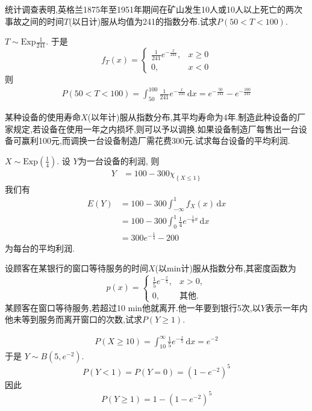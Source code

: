 \documentclass[../main.tex]{subfiles}
\begin{document}
\begin{exercise}{}{}
统计调查表明,英格兰1875年至1951年期间在矿山发生10人或10人以上死亡的两次事故之间的时间$T$(以日计)服从均值为241的指数分布.试求$P(50<T<100)$.
\end{exercise}

\begin{solution}
       \(  T\sim \mathrm{Exp}\frac{1 }{241 }   \). 于是 \[
    f_{T}\left( x \right)= \begin{cases} \frac{1 }{241 }e^{-\frac{x }{241 } }  ,&x\ge 0\\ 
     0,&x< 0\end{cases}  
    \]则 \[
    \begin{aligned}
    P\left( 50< T< 100 \right)= \int_{50}^{100}\frac{1 }{241 }e^{-\frac{x }{241 } }   \,\mathrm{d} x=e^{-\frac{50 }{241 } }-e^{-\frac{100 }{241 } }
    \end{aligned}
    \]
\end{solution}

\begin{exercise}{}{}
某种设备的使用寿命$X$(以年计)服从指数分布,其平均寿命为4年.制造此种设备的厂家规定,若设备在使用一年之内损坏,则可以予以调换.如果设备制造厂每售出一台设备可赢利100元,而调换一台设备制造厂需花费300元.试求每台设备的平均利润.
\end{exercise}
\begin{solution}
    \(  X\sim \mathrm{Exp}\left( \frac{1 }{4 }  \right)   \). 设 \(  Y  \)为一台设备的利润, 则 \[
  \begin{aligned}
    Y&=  100-300\chi _{\left\{ X\le 1 \right\}} 
  \end{aligned}
    \]  我们有 \[
 \begin{aligned}
    E\left( Y \right)
     &= 100-300 \int_{-\infty}^{1}f_{X}\left( x \right)\,\mathrm{d} x\\ 
      &=100-300 \int_{0}^{1}\frac{1 }{4 }e^{-\frac{1 }{4 }x }\,\mathrm{d} x\\ 
       &= 300e^{-\frac{1 }{4 } }-200
 \end{aligned}   
    \]为每台的平均利润.
\end{solution}

\begin{exercise}{}{}
设顾客在某银行的窗口等待服务的时间$X$(以min计)服从指数分布,其密度函数为
\[
p(x) = \begin{cases}
\frac{1}{5}e^{-\frac{x}{5}}, & x > 0, \\
0, & \text{其他}.
\end{cases}
\]
某顾客在窗口等待服务,若超过10 min他就离开.他一年要到银行5次,以$Y$表示一年内他未等到服务而离开窗口的次数,试求$P(Y\geq 1)$.
\end{exercise}
\begin{solution}
    \[
    \begin{aligned}
    P\left( X\ge 10 \right)= \int_{10}^{\infty}\frac{1 }{5 }e^{-\frac{x }{5 } }\,\mathrm{d} x= e^{-2}   
    \end{aligned}
    \]于是 \(  Y\sim B\left( 5,e^{-2} \right)   \). \[
    P\left( Y< 1 \right)= P\left( Y= 0 \right)=   \left( 1-e^{-2} \right)^{5} 
    \]因此 \[
    P\left( Y\ge 1 \right)= 1-\left( 1-e^{-2} \right)^{5}  
    \] 
\end{solution}
\end{document}
